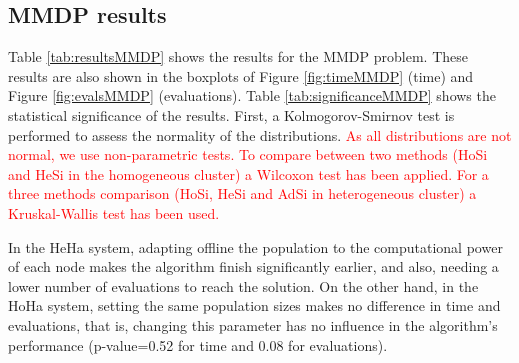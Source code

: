 \documentclass[final,1p,times]{elsarticle}
\begin{document}
\subsection{MMDP results}

Table \ref{tab:resultsMMDP} shows the results for the MMDP problem. These results are also shown in the boxplots of Figure \ref{fig:timeMMDP} (time) and Figure \ref{fig:evalsMMDP} (evaluations). Table \ref{tab:significanceMMDP} shows the statistical significance of the results. First, a Kolmogorov-Smirnov test is performed to assess the normality of the distributions. \textcolor{red}{As all distributions are not normal, we use non-parametric tests. To compare between two methods (HoSi and HeSi in the homogeneous cluster) a Wilcoxon test has been applied. For a three methods comparison (HoSi, HeSi and AdSi in heterogeneous cluster) a Kruskal-Wallis test has been used.} %

 In the HeHa system, adapting offline the population to the computational
 power of each node makes the algorithm finish significantly earlier,
 and also, needing a lower number of evaluations to reach the solution. On the other hand, in the HoHa system,
 setting the same population sizes makes no difference in time and
 evaluations, that is, changing this parameter has no influence in the
 algorithm's performance (p-value=0.52 for time and 0.08 for evaluations).


\begin{table}
\centering
\caption{Results for the MMDP problem.}
\label{tab:resultsMMDP}
\end{table}
\end{document}
